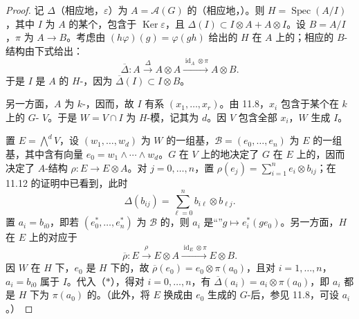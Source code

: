 \begin{proof}
记 $\Delta$（相应地，$\varepsilon$）为 $A=\mathcal A(G)$ 的（相应地，）。则 $H=\operatorname{Spec}(A/I)$，其中 $I$ 为 $A$ 的某个，包含于 $\operatorname{Ker}\varepsilon$，且 $\Delta(I)\subset I\otimes A+A\otimes I$。设 $B=A/I$，$\pi$ 为 $A\to B$。考虑由 $(h\varphi)(g)=\varphi(gh)$ 给出的 $H$ 在 $A$ 上的；相应的 $B$-结构由下式给出：
\[
\overline\Delta:A\xrightarrow{\Delta}A\otimes A\xrightarrow{\operatorname{id}_A\otimes\pi}A\otimes B.
\]
于是 $I$ 是 $A$ 的 $H$-，因为 $\overline\Delta(I)\subset I\otimes B$。

另一方面，$A$ 为 $k$-，因而，故 $I$ 有系 $(x_1,\ldots,x_r)$。由 11.8，$x_i$ 包含于某个在 $k$ 上的 $G$- $V$。于是 $W=V\cap I$ 为 $H$-模，记其为 $d$。因 $V$ 包含全部 $x_i$，$W$ 生成 $I$。

置 $E=\bigwedge^d V$，设 $(w_1,\ldots,w_d)$ 为 $W$ 的一组基，$\mathcal B=(e_0,\ldots,e_n)$ 为 $E$ 的一组基，其中含有向量 $e_0=w_1\wedge\cdots\wedge w_d$。$G$ 在 $V$ 上的地决定了 $G$ 在 $E$ 上的，因而决定了 $A$-结构 $\rho:E\to E\otimes A$。对 $j=0,\ldots,n$，置 $\rho(e_j)=\sum_{i=1}^n e_i\otimes b_{ij}$；在 11.12 的证明中已看到，此时
\[
\Delta(b_{ij})=\sum_{\ell=0}^n b_{i\ell}\otimes b_{\ell j}.\tag{$*$}
\]
置 $a_i=b_{i0}$，即若 $(e_0^*,\ldots,e_n^*)$ 为 $\mathcal B$ 的，则 $a_i$ 是“”$g\mapsto e_i^*(ge_0)$。另一方面，$H$ 在 $E$ 上的对应于
\[
\overline\rho:E\xrightarrow{\rho}E\otimes A\xrightarrow{\operatorname{id}_E\otimes\pi}E\otimes B.
\]
因 $W$ 在 $H$ 下，$e_0$ 是 $H$ 下的，故 $\overline\rho(e_0)=e_0\otimes\pi(a_0)$，且对 $i=1,\ldots,n$，$a_i=b_{i0}$ 属于 $I$。代入（$*$），得对 $i=0,\ldots,n$，有 $\overline\Delta(a_i)=a_i\otimes\pi(a_0)$，即 $a_i$ 都是 $H$ 下为 $\pi(a_0)$ 的。（此外，将 $E$ 换成由 $e_0$ 生成的 $G$-后，参见 11.8，可设 $a_i$ 。）


\end{proof}
